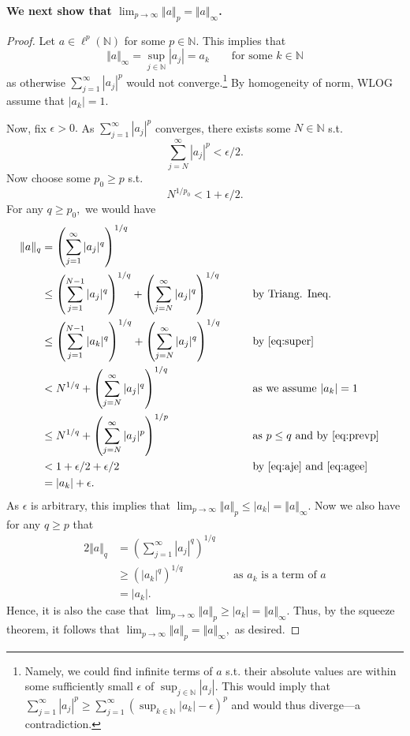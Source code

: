 \documentclass[10pt]{article}
\begin{document}
\noindent
\textbf{We next show that $\lim_{p\to\infty}\Vert a \Vert_p = \Vert a \Vert_\infty$.}

\begin{proof}
    Let $a \in \ell^p(\mathbb{N})$ for some $p\in\mathbb{N}.$ This implies that
    \begin{equation} \label{eq:super}
        \Vert a \Vert_\infty = \sup_{j\in\mathbb{N}}|a_j|= a_k \qquad\text{for some }k\in\mathbb{N}
    \end{equation}
    as otherwise $\sum_{j=1}^{\infty}|a_j|^p$ would not converge.\footnote{Namely, we could find infinite terms of $a$ s.t. their absolute values are within some sufficiently small $\epsilon$ of $\sup_{j\in\mathbb{N}}|a_j|$. This would imply that $\sum_{j=1}^{\infty}|a_j|^p \ge \sum_{j=1}^{\infty}(\sup_{k\in\mathbb{N}}|a_k|-\epsilon)^p$ and would thus diverge---a contradiction.} By homogeneity of norm, WLOG assume that $|a_k|=1.$


    Now, fix $\epsilon > 0.$ As $\sum_{j=1}^{\infty}|a_j|^p$ converges, there exists some $N\in\mathbb{N}$ s.t.
    \begin{equation} \label{eq:aje}
        \sum_{j=N}^{\infty}|a_j|^p < \epsilon/2.
    \end{equation}
    Now choose some $p_0\ge p$ s.t.
    \begin{equation} \label{eq:agee}
        N^{1/p_0}<1 +  \epsilon/2.
    \end{equation}
    For any $q\ge p_0,$ we would have
    \begin{alignat*}{2}
        \Vert a \Vert_q &= \left(\sum_{j=1}^{\infty}|a_j|^q\right)^{1/q}\\
        &\le \left(\sum_{j=1}^{N-1}|a_j|^q\right)^{1/q} + \left(\sum_{j=N}^{\infty}|a_j|^q\right)^{1/q}\qquad&&\text{by Triang. Ineq.}\\
        &\le \left(\sum_{j=1}^{N-1}|a_k|^q\right)^{1/q} + \left(\sum_{j=N}^{\infty}|a_j|^q\right)^{1/q}&&\text{by \eqref{eq:super}}\\
        &< N^{1/q} + \left(\sum_{j=N}^{\infty}|a_j|^q\right)^{1/q}&&\text{as we assume $|a_k|=1$}\\
        &\le N^{1/q}  + \left(\sum_{j=N}^{\infty}|a_j|^p\right)^{1/p} &&\text{as $p\le q$ and by \eqref{eq:prevp}}\\
        &<1 + \epsilon/2 + \epsilon/2 &&\text{by \eqref{eq:aje} and \eqref{eq:agee}}\\
        &=|a_k| + \epsilon.
    \end{alignat*}
    As $\epsilon$ is arbitrary, this implies that  $\lim_{p\to\infty}\Vert a \Vert_p \le |a_k| = \Vert a\Vert_\infty.$
    Now we also have for any $q\ge p$ that
    \begin{alignat*}{2}
        \Vert a \Vert_q &= \left(\sum_{j=1}^{\infty}|a_j|^q\right)^{1/q}\\
        &\ge (|a_k|^q)^{1/q} \qquad&&\text{as $a_k$ is a term of $a$}\\
        &=|a_k|.
    \end{alignat*}
    Hence, it is also the case that  $\lim_{p\to\infty}\Vert a \Vert_p \ge |a_k| = \Vert a\Vert_\infty.$ Thus, by the squeeze theorem, it follows that  $\lim_{p\to\infty}\Vert a \Vert_p = \Vert a\Vert_\infty,$ as desired.
    


\end{proof}
\end{document}
